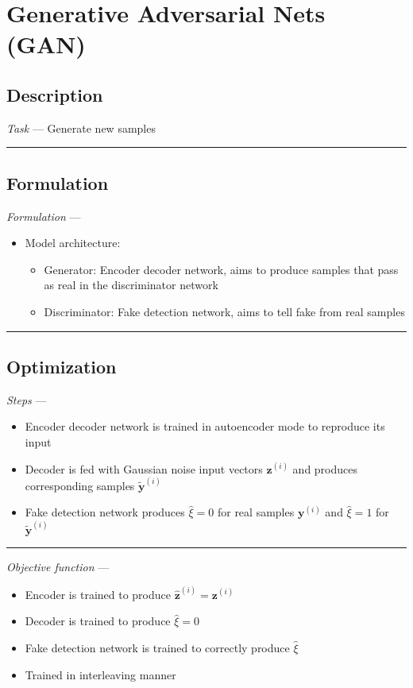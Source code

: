 \section{Generative Adversarial Nets (GAN)}
\subsection*{Description}
\emph{Task} --- Generate new samples

{\color{black}\hrule height 0.001mm}

\subsection*{Formulation}
\emph{Formulation} --- 
\begin{itemize}
    \item Model architecture: 
    \begin{itemize}
        \item Generator: Encoder decoder network, aims to produce samples that pass as real in the discriminator network
        \item Discriminator: Fake detection network, aims to tell fake from real samples
    \end{itemize}
\end{itemize}

{\color{black}\hrule height 0.001mm}

\subsection*{Optimization}
\emph{Steps} --- 
\begin{itemize}
    \item Encoder decoder network is trained in autoencoder mode to reproduce its input
    \item Decoder is fed with Gaussian noise input vectors $\boldsymbol{z}^{(i)}$ and produces corresponding samples $\tilde{\boldsymbol{y}}^{(i)}$
    \item Fake detection network produces $\hat{\xi} = 0$ for real samples $\boldsymbol{y}^{(i)}$ and $\hat{\xi} = 1$ for $\tilde{\boldsymbol{y}}^{(i)}$
\end{itemize}

{\color{lightgray}\hrule height 0.001mm}

\emph{Objective function} --- 
\begin{itemize}
    \item Encoder is trained to produce $\boldsymbol{\hat{z}}^{(i)} = \boldsymbol{z}^{(i)}$
    \item Decoder is trained to produce $\hat{\xi} = 0$
    \item Fake detection network is trained to correctly produce $\hat{\xi}$
    \item Trained in interleaving manner
\end{itemize}